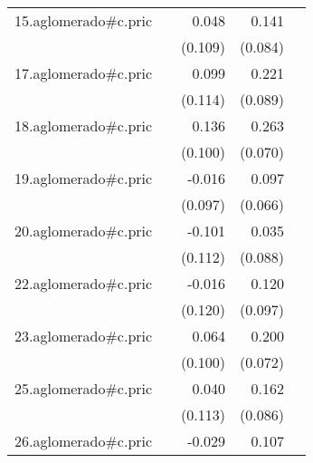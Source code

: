 {\begin{longtable}{l*{4}{D{.}{.}{-1}}}
\addlinespace
15.aglomerado#c.pric&                     &       0.048         &       0.141         &                     \\
            &                     &     (0.109)         &     (0.084)         &                     \\
\addlinespace
17.aglomerado#c.pric&                     &       0.099         &       0.221\sym{*}  &                     \\
            &                     &     (0.114)         &     (0.089)         &                     \\
\addlinespace
18.aglomerado#c.pric&                     &       0.136         &       0.263\sym{***}&                     \\
            &                     &     (0.100)         &     (0.070)         &                     \\
\addlinespace
19.aglomerado#c.pric&                     &      -0.016         &       0.097         &                     \\
            &                     &     (0.097)         &     (0.066)         &                     \\
\addlinespace
20.aglomerado#c.pric&                     &      -0.101         &       0.035         &                     \\
            &                     &     (0.112)         &     (0.088)         &                     \\
\addlinespace
22.aglomerado#c.pric&                     &      -0.016         &       0.120         &                     \\
            &                     &     (0.120)         &     (0.097)         &                     \\
\addlinespace
23.aglomerado#c.pric&                     &       0.064         &       0.200\sym{**} &                     \\
            &                     &     (0.100)         &     (0.072)         &                     \\
\addlinespace
25.aglomerado#c.pric&                     &       0.040         &       0.162         &                     \\
            &                     &     (0.113)         &     (0.086)         &                     \\
\addlinespace
26.aglomerado#c.pric&                     &      -0.029         &       0.107         &                     \\

\end{longtable}}
